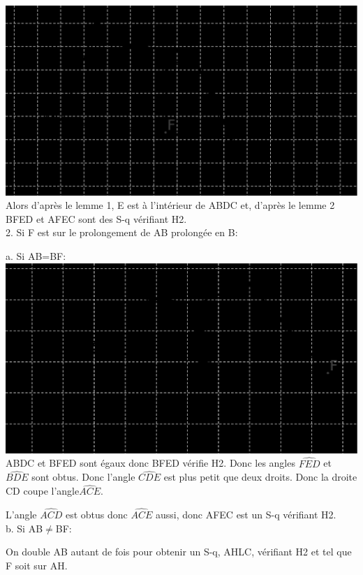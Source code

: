 \documentclass[a4paper, 12pt, twoside]{book}
\begin{document}
 \includegraphics[scale=0.7]{figures/sacc170.eps}\\
 
 Alors d'après le lemme 1, E est à l'intérieur de ABDC et, d'après le lemme 2 BFED et AFEC sont des S-q vérifiant H2.\\
 
 2. Si F est sur le prolongement de AB prolongée en B:\

a. Si AB=BF:\\

\includegraphics[scale=0.5]{figures/sacc170bis.eps}\\

ABDC et BFED sont égaux donc BFED vérifie H2. Donc les angles $\hat{FED}$ et $\hat{BDE}$ sont obtus. Donc l'angle $\hat{CDE}$ est plus petit que deux droits. Donc la droite CD coupe l'angle$\hat{ACE}$. \

L'angle $\hat{ACD}$ est obtus donc $\hat{ACE}$ aussi, donc AFEC est un S-q vérifiant H2.\\

b. Si AB$\neq$BF:\

On double AB autant de fois pour obtenir un S-q, AHLC, vérifiant H2 et tel que F soit sur AH.\\
\end{document}
